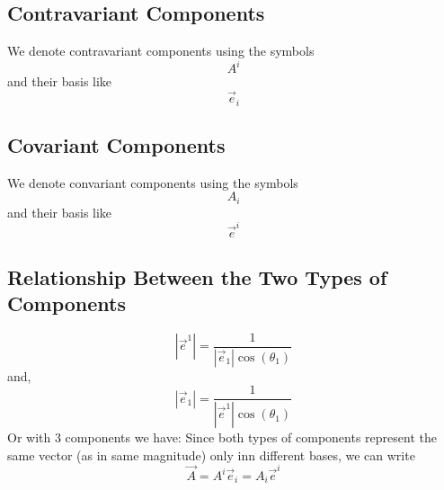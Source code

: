 \subsection{Contravariant Components}
We denote contravariant components using the symbols
$$A^i$$
and their basis like
$$\overrightarrow{e}_i$$
\subsection{Covariant Components}
We denote convariant components using the symbols
$$A_i$$
and their basis like
$${\overrightarrow{e}}^i$$
\subsection{Relationship Between the Two Types of Components}

$$|\overrightarrow{e}^1| = \frac{1}{|\overrightarrow{e}_1|\cos(\theta_1)}$$
and,
$$|\overrightarrow{e}_1| = \frac{1}{|\overrightarrow{e}^1|\cos(\theta_1)}$$
Or with 3 components we have:
Since both types of components represent the same vector (as in same magnitude) only inn  different bases, we can write
$$\overrightarrow{A} = A^{i}\overrightarrow{e}_i = A_{i}\overrightarrow{e}^i$$
